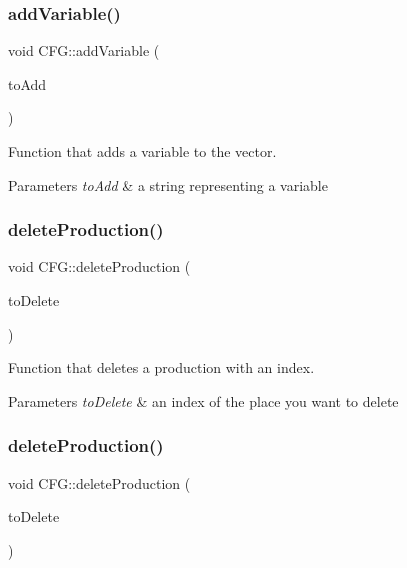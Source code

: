 \subsubsection{\texorpdfstring{add\+Variable()}{addVariable()}}
{\footnotesize\ttfamily void C\+F\+G\+::add\+Variable (\begin{DoxyParamCaption}\item[{const std\+::string \&}]{to\+Add }\end{DoxyParamCaption})}



Function that adds a variable to the vector. 


\begin{DoxyParams}{Parameters}
{\em to\+Add} & a string representing a variable \\
\hline
\end{DoxyParams}
\mbox{\label{classCFG_a4552d136dbb7b8315e8cbc3f1dc1d26e}} 
\subsubsection{\texorpdfstring{delete\+Production()}{deleteProduction()}\hspace{0.1cm}{\footnotesize\ttfamily [1/2]}}
{\footnotesize\ttfamily void C\+F\+G\+::delete\+Production (\begin{DoxyParamCaption}\item[{int}]{to\+Delete }\end{DoxyParamCaption})}



Function that deletes a production with an index. 


\begin{DoxyParams}{Parameters}
{\em to\+Delete} & an index of the place you want to delete \\
\hline
\end{DoxyParams}
\mbox{\label{classCFG_acd474c77447e00eadd4a0b82ee1f765c}} 
\subsubsection{\texorpdfstring{delete\+Production()}{deleteProduction()}\hspace{0.1cm}{\footnotesize\ttfamily [2/2]}}
{\footnotesize\ttfamily void C\+F\+G\+::delete\+Production (\begin{DoxyParamCaption}\item[{const \hyperlink{classCFGProduction}{C\+F\+G\+Production} \&}]{to\+Delete }\end{DoxyParamCaption})}



